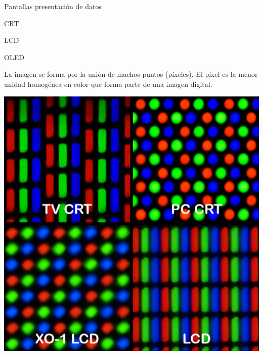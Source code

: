 \begin{frame}

  \begin{block}{Pantallas presentaci\'on de datos}

    \begin{itemize}
      \begin{multicols}{3}
      \item \ac{CRT}
      \item \ac{LCD}
      \item \ac{OLED}
      \end{multicols}
    \end{itemize}

	La imagen se forma por la uni\'on de muchos puntos (p\'ixeles). El p\'ixel es la menor 
unidad homog\'enea en color que forma parte de una imagen digital. 

      \includegraphics[width=0.4\linewidth]{imagenes/1.4.pantalla.electronica/Pixel_geometry_01_Pengo.jpg}


  \end{block}
  
\end{frame}

